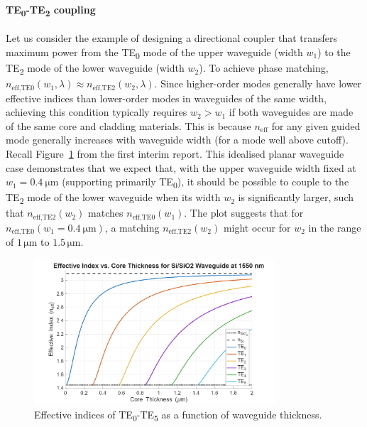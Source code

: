 \documentclass[10pt, a4paper]{article}
\begin{document}
\paragraph{TE\textsubscript{0}-TE\textsubscript{2} coupling}
Let us consider the example of designing a directional coupler that transfers maximum power from the TE\textsubscript{0} mode of the upper waveguide (width \(w_1\)) to the TE\textsubscript{2} mode of the lower waveguide (width \(w_2\)).
To achieve phase matching, \(n_{\text{eff,TE0}}(w_1, \lambda) \approx n_{\text{eff,TE2}}(w_2, \lambda)\).
Since higher-order modes generally have lower effective indices than lower-order modes in waveguides of the same width, achieving this condition typically requires \(w_2 > w_1\) if both waveguides are made of the same core and cladding materials. This is because \(n_\text{eff}\) for any given guided mode generally increases with waveguide width (for a mode well above cutoff).
Recall Figure~\ref{fig:te_neff} from the first interim report\autocite{ngSB4IntegratedPhotonics2025}.
This idealised planar waveguide case demonstrates that we expect that,
with the upper waveguide width fixed at \(w_1=\SI{0.4}{\um}\) (supporting primarily TE\textsubscript{0}),
it should be possible to couple to the TE\textsubscript{2} mode of the lower waveguide when its width \(w_2\) is significantly larger, such that \(n_{\text{eff,TE2}}(w_2)\) matches \(n_{\text{eff,TE0}}(w_1)\).
The plot suggests that for \(n_{\text{eff,TE0}}(w_1=\SI{0.4}{\um})\), a matching \(n_{\text{eff,TE2}}(w_2)\) might occur for \(w_2\) in the range of \(1\,\unit{\um}\) to \(1.5\,\unit{\um}\).

\begin{figure}[h!]
  \centering
  \includegraphics[width=0.8\textwidth]{task1/neff_vs_thickness_Si_SiO2_1550nm.png}
  \caption{Effective indices of TE\textsubscript{0}-TE\textsubscript{5} as a function of waveguide thickness.}
  \label{fig:te_neff}
\end{figure}
\end{document}

